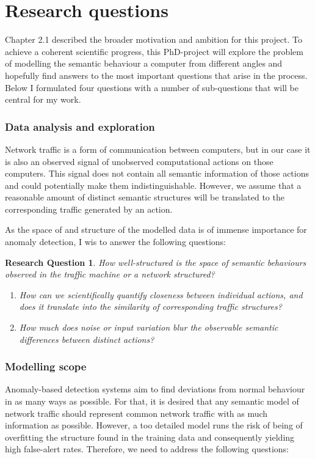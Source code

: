 \documentclass[a4paper,12pt,twoside]{report}
\newtheorem{rquestion}{Research Question}
\begin{document}
\section{Research questions}

Chapter 2.1 described the broader motivation and ambition for this project. To achieve a coherent scientific progress, this PhD-project will explore the problem of modelling the semantic behaviour a computer from different angles and hopefully find answers to the most important questions that arise in the process. Below I formulated four questions with a number of sub-questions that will be central for my work.


\subsubsection{Data analysis and exploration}

Network traffic is a form of communication between computers, but in our case it is also an observed signal of unobserved computational actions on those computers. This signal does not contain all semantic information of those actions and could potentially make them indistinguishable. 
However, we assume that a reasonable amount of distinct semantic structures will be translated to the corresponding traffic generated by an action.

As the space of and structure of the modelled data is of immense importance for anomaly detection, I wis to answer the following questions:

\begin{rquestion}
How well-structured is the space of semantic behaviours observed in the traffic  machine or a network structured? 
\begin{enumerate}
\item How can we scientifically quantify closeness between individual actions, and does it translate into the similarity of corresponding traffic structures? 
\item How much does noise or input variation blur the observable semantic differences between distinct actions?
\end{enumerate}
\end{rquestion}

\subsubsection{Modelling scope}

Anomaly-based detection systems aim to find deviations from normal behaviour in as many ways as possible. For that, it is desired that any semantic model of network traffic should represent common network traffic with as much information as possible. However, a too detailed model runs the risk of being of overfitting the structure found in the training data and consequently yielding high false-alert rates. Therefore, we need to address the following questions: 
\end{document}
